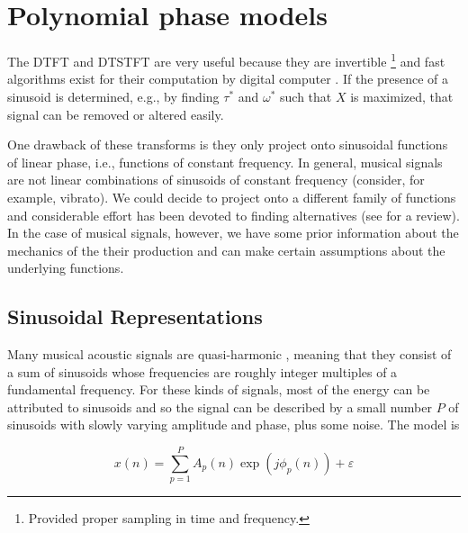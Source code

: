 \section{Polynomial phase models\label{sec:polynomphasemodel}}

The DTFT and DTSTFT are very useful because they are invertible
\cite{portnoff1976implementation}%
\footnote{Provided proper sampling in time and frequency.}
and fast algorithms exist for their 
computation by digital computer \cite{van1992computational}. If the presence of
a sinusoid is determined, e.g., by finding $\tau^{\ast}$ and $\omega^{\ast}$ such that
$X$ is maximized, that signal can be removed or altered easily.

One drawback of these transforms is they only project onto sinusoidal functions
of linear phase, i.e., functions of constant frequency. In general, musical
signals are not linear combinations of sinusoids of constant frequency
(consider, for example, vibrato). We could decide to project onto a different
family of functions and considerable effort has been devoted to finding
alternatives (see \cite{kereliuk2011sparse} for a review). In the case of
musical signals, however, we have some prior information about the mechanics of
the their production and can make certain assumptions about the underlying
functions.

\subsection{Sinusoidal Representations\label{sec:mqfmfromphase}} Many musical
acoustic signals are quasi-harmonic \cite{fletcher2012physics}, meaning that
they consist of a sum of sinusoids whose frequencies are roughly integer
multiples of a fundamental frequency. For these kinds of signals, most of the
energy can be attributed to sinusoids and so
the signal can be described by a small number $P$ of sinusoids with
slowly varying amplitude and phase, plus some noise. The model is

\begin{equation}
    \label{eq:sumofsinesampphasesep}
    x(n)=\sum_{p=1}^{P} A_p(n) \exp(j \phi_p(n)) + \varepsilon
\end{equation}

